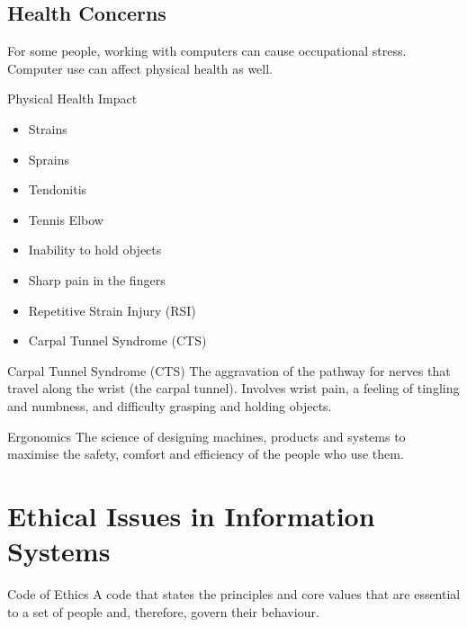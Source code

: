 \documentclass[\main/notes.tex]{subfiles}
\begin{document}
			\subsection{Health Concerns}
				For some people, working with computers can cause occupational stress. Computer use can affect physical health as well.
				\begin{sidenote}{Physical Health Impact}
					\begin{multicols}{2}
						\begin{itemize}[nosep]
							\item Strains
							\item Sprains
							\item Tendonitis
							\item Tennis Elbow
							\item Inability to hold objects
							\item Sharp pain in the fingers
							\item Repetitive Strain Injury (RSI)
							\item Carpal Tunnel Syndrome (CTS)
						\end{itemize}
					\end{multicols}
					\begin{definition}{Carpal Tunnel Syndrome (CTS)}
						The aggravation of the pathway for nerves that travel along the wrist (the carpal tunnel). Involves wrist pain, a feeling of tingling and numbness, and difficulty grasping and holding objects.
					\end{definition}
				\end{sidenote}
			\begin{definition}{Ergonomics}
				The science of designing machines, products and systems to maximise the safety, comfort and efficiency of the people who use them.
			\end{definition}

		\section{Ethical Issues in Information Systems}
			\begin{definition}{Code of Ethics}
				A code that states the principles and core values that are essential to a set of people and, therefore, govern their behaviour.
			\end{definition}

	\vbox{}
\end{document}
